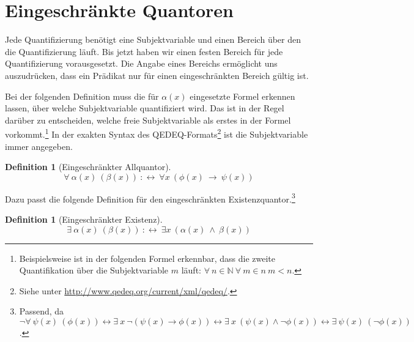 \documentclass[a4paper,german,10pt,twoside]{book}
\theoremstyle{definition}
\newtheorem{defn}[thm]{Definition}
\theoremstyle{remark}
\begin{document}
\section{Eingeschr{\"a}nkte Quantoren} \label{chapter6_section1} \hypertarget{chapter6_section1}{}
Jede Quantifizierung ben{\"o}tigt eine Subjektvariable und einen Bereich {\"u}ber den die Quantifizierung l{\"a}uft. Bis jetzt haben wir einen festen Bereich f{\"u}r jede Quantifizierung vorausgesetzt. Die Angabe eines Bereichs erm{\"o}glicht uns auszudr{\"u}cken, dass ein Pr{\"a}dikat nur f{\"u}r einen eingeschr{\"a}nkten Bereich g{\"u}ltig ist.

\par
Bei der folgenden Definition muss die f{\"u}r $\alpha(x)$ eingesetzte Formel {\glqq erkennen lassen\grqq}, {\"u}ber welche Subjektvariable quantifiziert wird. Das ist in der Regel dar{\"u}ber zu entscheiden, welche freie Subjektvariable als erstes in der Formel vorkommt.\footnote{Beispielsweise ist in der folgenden Formel erkennbar, dass die zweite Quantifikation {\"u}ber die Subjektvariable $m$ l{\"a}uft: $\forall \ n \in \mathbb{N} \ \forall \ m \in n \ m < n $.} In der exakten Syntax des QEDEQ-Formats\footnote{Siehe unter \url{http://www.qedeq.org/current/xml/qedeq/}.} ist die Subjektvariable immer angegeben.

\begin{defn}[Eingeschr{\"a}nkter Allquantor]
\label{definition:restrictedUniversalQuantifier} \hypertarget{definition:restrictedUniversalQuantifier}{}
$$\forall \ \alpha(x) \ (\beta(x))\ :\leftrightarrow \ \forall x\ (\phi(x)\ \rightarrow \ \psi(x))$$

\end{defn}




\par
Dazu passt die folgende Definition f{\"u}r den eingeschr{\"a}nkten Existenzquantor.\footnote{Passend, da $\neg \forall \ \psi(x) \ (\phi(x)) \leftrightarrow \exists \ x \ \neg (\psi(x) \rightarrow \phi(x)) \leftrightarrow \exists \ x \ (\psi(x) \land \neg\phi(x)) \leftrightarrow \exists \ \psi(x) \ (\neg\phi(x))$.}

\begin{defn}[Eingeschr{\"a}nkter Existenz]
\label{definition:restrictedExistentialQuantifier} \hypertarget{definition:restrictedExistentialQuantifier}{}
$$\exists \ \alpha(x) \ (\beta(x))\ :\leftrightarrow \ \exists x\ (\alpha(x)\ \land \ \beta(x))$$

\end{defn}
\end{document}
